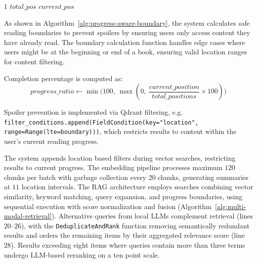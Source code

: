 \begin{algorithm}[!t]
\caption{Progress-Aware Boundary Enforcement}
\label{alg:progress-aware-boundary}
\begin{algorithmic}[1]
        \State \Return $1$
        \State \Return $total\_pos$
    \Else
        \State \Return $current\_pos$
    \EndIf
\EndFunction
\end{algorithmic}
\end{algorithm}

As shown in Algorithm~\ref{alg:progress-aware-boundary}, the system calculates safe reading boundaries to prevent spoilers by ensuring users only access content they have already read.  
The boundary calculation function handles edge cases where users might be at the beginning or end of a book, ensuring valid location ranges for content filtering.

\noindent Completion percentage is computed as:
\[
    progress\_ratio \gets \min\!\bigl(100,\ \max(0,\ \frac{current\_position}{total\_positions} \times 100)\bigr)
\]


\begin{sloppypar}
Spoiler prevention is implemented via Qdrant filtering, e.g.
{\nolinkurl{filter_conditions.append(FieldCondition(key="location", range=Range(lte=boundary)))}},
which restricts results to content within the user’s current reading progress.
\end{sloppypar}

The system appends location based filters during vector searches, restricting results to current progress.
The embedding pipeline processes maximum $120$ chunks per batch with garbage collection every 20 chunks, generating summaries at $11$ location intervals.
The RAG architecture employs searches combining vector similarity, keyword matching, query expansion, and progress boundaries, using sequential execution with score normalization and fusion (Algorithm~\ref{alg:multi-modal-retrieval}).
Alternative queries from local LLMs complement retrieval (lines $20$–$26$), with the \texttt{DeduplicateAndRank} function removing semantically redundant results and orders the remaining items by their aggregated relevance score (line $28$).
Results exceeding eight items where queries contain more than three terms undergo LLM-based reranking on a ten point scale.


